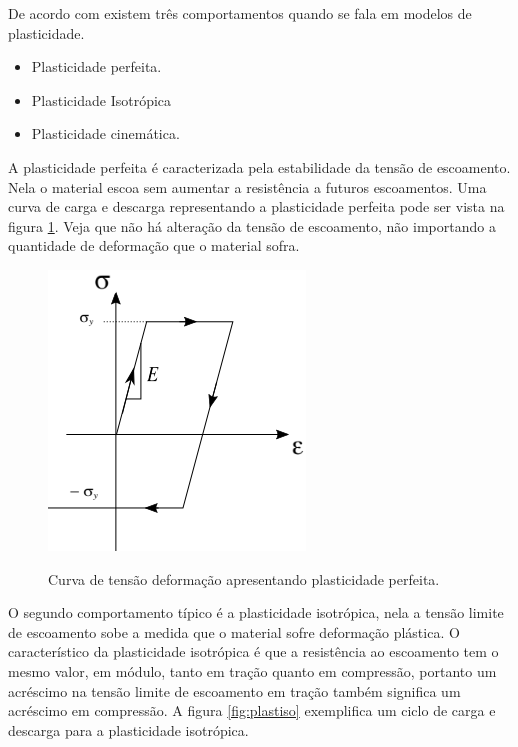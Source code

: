 De acordo com \cite{neto_peric_owens_2008} existem três comportamentos quando se fala em modelos de plasticidade. 
\begin{itemize}
    \item Plasticidade perfeita.
    \item Plasticidade Isotrópica
    \item Plasticidade cinemática.
\end{itemize}
\par

A plasticidade perfeita é caracterizada pela estabilidade da tensão de escoamento. Nela o material escoa sem aumentar a resistência a futuros escoamentos. Uma curva de carga e descarga representando a plasticidade perfeita pode ser vista na figura \ref{fig:plastperf}. Veja que não há alteração da tensão de escoamento, não importando a quantidade de deformação que o material sofra. \\ 
\begin{figure}[H]
    \centering
    \caption{Curva de tensão deformação apresentando plasticidade perfeita. }
    \includegraphics[width=0.5\linewidth]{images/plasticidade_perfeita.png}
    \label{fig:plastperf}
\end{figure}

O segundo comportamento típico é a plasticidade isotrópica, nela a tensão limite de escoamento sobe a medida que o material sofre deformação plástica. O característico da plasticidade isotrópica é que a resistência ao escoamento tem o mesmo valor, em módulo, tanto em tração quanto em compressão, portanto um acréscimo na tensão limite de escoamento em tração também significa um acréscimo em compressão. A figura \ref{fig:plastiso} exemplifica um ciclo de carga e descarga para a plasticidade isotrópica.

